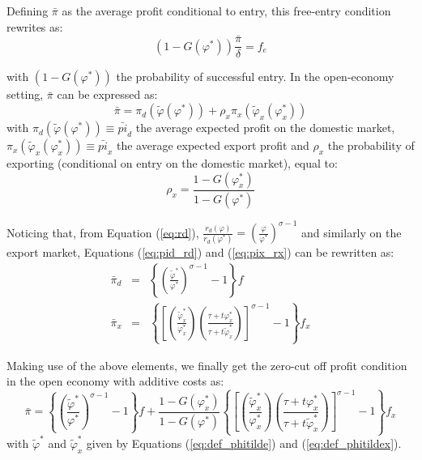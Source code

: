 \documentclass[a4paper,11pt]{article}
\begin{document}
Defining $\bar{\pi}$ as the average profit conditional to entry, this free-entry condition rewrites as:
\begin{equation}
\left(1-G(\varphi^\ast)\right)\frac{\bar{\pi}}{\delta} = f_e \label{eq:FEC}
\end{equation}


\noindent with $\left(1-G(\varphi^\ast)\right)$ the probability of successful entry. In the open-economy setting, $\bar{\pi}$ can be expressed as:
$$\bar{\pi} =\pi_d(\widetilde{\varphi}(\varphi^\ast)) + \rho_x \pi_x(\widetilde{\varphi}_x(\varphi_x^\ast))$$
\noindent with $\pi_d(\widetilde{\varphi}(\varphi^\ast)) \equiv \bar{pi}_d$ the average expected profit on the domestic market, $\pi_x(\widetilde{\varphi}_x(\varphi_x^\ast))\equiv \bar{pi}_x$ the average expected export profit and $\rho_x$ the probability of exporting (conditional on entry on the domestic market), equal to:
$$\rho_x = \frac{1-G(\varphi_x^\ast)}{1-G(\varphi^\ast)}$$

Noticing that, from Equation (\ref{eq:rd}), $\frac{r_d(\varphi)}{r_d(\varphi^\ast)} = \left( \frac{\varphi}{\varphi^\ast} \right)^{\sigma-1}$ and similarly on the export market, Equations (\ref{eq:pid_rd}) and (\ref{eq:pix_rx}) can be rewritten as:
\begin{eqnarray*}
\bar{\pi}_d &=& \left\{\left(\frac{\widetilde{\varphi}^\ast}{\varphi^\ast}\right)^{\sigma-1}-1 \right\}f \\
\bar{\pi}_x &=& \left\{\left[\left(\frac{\widetilde{\varphi}_x^\ast}{\varphi_x^\ast}\right)\left(\frac{\tau+ t \varphi^\ast_x}{\tau+ t \widetilde{\varphi}^\ast_x}\right)\right]^{\sigma-1}-1 \right\}f_x
\end{eqnarray*}

Making use of the above elements, we finally get the zero-cut off profit condition in the open economy with additive costs as:
\begin{equation}
\bar{\pi} = \left\{\left(\frac{\widetilde{\varphi}^\ast}{\varphi^\ast}\right)^{\sigma-1}-1 \right\}f +  \frac{1-G(\varphi_x^\ast)}{1-G(\varphi^\ast)}\left\{\left[\left(\frac{\widetilde{\varphi}_x^\ast}{\varphi_x^\ast}\right)\left(\frac{\tau+ t \varphi^\ast_x}{\tau+ t \widetilde{\varphi}^\ast_x}\right)\right]^{\sigma-1}-1 \right\}f_x \label{eq:ZCP}
\end{equation}
\noindent with $\widetilde{\varphi}^\ast$ and $\widetilde{\varphi}_x^\ast$ given by Equations (\ref{eq:def_phitilde}) and (\ref{eq:def_phitildex}).
\end{document}
